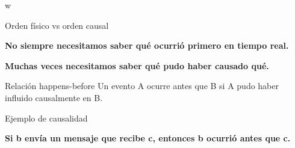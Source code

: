 w\documentclass[aspectratio=169]{beamer}
\begin{document}
\begin{frame}{Orden físico vs orden causal}

\Large

\begin{center}
\textbf{No siempre necesitamos saber qué ocurrió primero en tiempo real.}
\end{center}

\vspace{0.6cm}

\begin{center}
\textbf{Muchas veces necesitamos saber qué pudo haber causado qué.}
\end{center}

\vspace{0.8cm}

\normalsize

\begin{block}{Relación happens-before}
Un evento A ocurre antes que B si A pudo haber influido causalmente en B.
\end{block}

\end{frame}

\begin{frame}{Ejemplo de causalidad}

\begin{center}
\end{center}

\vspace{0.5cm}

\Large

\begin{center}
\textbf{Si b envía un mensaje que recibe c, entonces b ocurrió antes que c.}
\end{center}

\end{frame}
\end{document}
